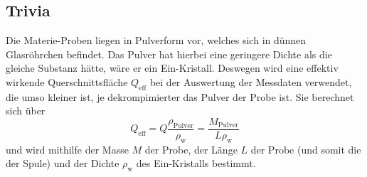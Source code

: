 \subsection{Trivia}

    Die Materie-Proben liegen in Pulverform vor, welches sich in dünnen Glasröhrchen befindet. 
    Das Pulver hat hierbei eine geringere Dichte als die gleiche Substanz hätte, wäre er ein Ein-Kristall.
    Deswegen wird eine effektiv wirkende Querschnittsfläche $Q_\text{eff}$ bei der Auswertung der Messdaten verwendet, 
    die umso kleiner ist, je dekrompimierter das Pulver der Probe ist. 
    Sie berechnet sich über 
    \begin{equation}
        Q_\text{eff}=Q\frac{\rho_\text{Pulver}}{\rho_\text{w}}=\frac{M_\text{Pulver}}{L \rho_\text{w}}
        \label{eqn:effQ}
    \end{equation}
    und wird mithilfe der Masse $M$ der Probe, der Länge $L$ der Probe (und somit die der Spule) und der 
    Dichte $\rho_\text{w}$ des Ein-Kristalls bestimmt. 